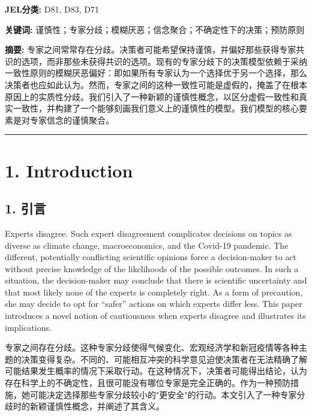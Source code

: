 \documentclass[12pt,a4paper]{article}
\newenvironment{original}
  {\par\noindent\ignorespaces}
  {\par}
\newenvironment{translation}
  {\par\noindent{\color{transblue}\ignorespaces}}
  {\par\medskip}
\begin{document}
\begin{translation}
\textbf{JEL分类:} D81, D83, D71

\textbf{关键词:} 谨慎性；专家分歧；模糊厌恶；信念聚合；不确定性下的决策；预防原则

\textbf{摘要:} 专家之间常常存在分歧。决策者可能希望保持谨慎，并偏好那些获得专家共识的选项，而非那些未获得共识的选项。现有的专家分歧下的决策模型依赖于采纳一致性原则的模糊厌恶偏好：即如果所有专家认为一个选择优于另一个选择，那么决策者也应如此认为。然而，专家之间的这种一致性可能是虚假的，掩盖了在根本原因上的实质性分歧。我们引入了一种新颖的谨慎性概念，以区分虚假一致性和真实一致性，并构建了一个能够刻画我们意义上的谨慎性的模型。我们模型的核心要素是对专家信念的谨慎聚合。
\end{translation}

\vspace{8pt}
\hrule
\newpage

\section{1. Introduction}
{\color{transblue}\subsection*{1. 引言}}

\begin{original}
Experts disagree. Such expert disagreement complicates decisions on topics as diverse as climate change, macroeconomics, and the Covid-19 pandemic. The different, potentially conflicting scientific opinions force a decision-maker to act without precise knowledge of the likelihoods of the possible outcomes. In such a situation, the decision-maker may conclude that there is scientific uncertainty and that most likely none of the experts is completely right. As a form of precaution, she may decide to opt for ``safer'' actions on which experts differ less. This paper introduces a novel notion of cautiousness when experts disagree and illustrates its implications.
\end{original}

\begin{translation}
专家之间存在分歧。这种专家分歧使得气候变化、宏观经济学和新冠疫情等各种主题的决策变得复杂。不同的、可能相互冲突的科学意见迫使决策者在无法精确了解可能结果发生概率的情况下采取行动。在这种情况下，决策者可能得出结论，认为存在科学上的不确定性，且很可能没有哪位专家是完全正确的。作为一种预防措施，她可能决定选择那些专家分歧较小的"更安全"的行动。本文引入了一种专家分歧时的新颖谨慎性概念，并阐述了其含义。
\end{translation}
\end{document}

